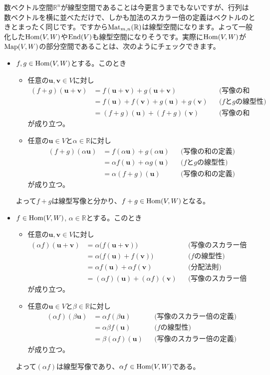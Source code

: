 数ベクトル空間$\mathbb{R}^n$が線型空間であることは今更言うまでもないですが、行列は数ベクトルを横に並べただけで、しかも加法のスカラー倍の定義はベクトルのときとまったく同じです。ですから$\operatorname{Mat}_{m, n}(\mathbb{R})$は線型空間になります。よって一般化した$\operatorname{Hom}(V, W)$や$\operatorname{End}(V)$も線型空間になりそうです。実際に$\operatorname{Hom}(V, W)$が$\operatorname{Map}(V, W)$の部分空間であることは、次のようにチェックできます。
\begin{itemize}
\item $f, g\in \operatorname{Hom}(V, W)$とする。このとき
\begin{itemize}
\item 任意の$\bm{u}, \bm{v}\in V$に対し
\begin{align*}
(f + g)(\bm{u} + \bm{v})
&= f(\bm{u} + \bm{v}) + g(\bm{u} + \bm{v}) & & \text{(写像の和の定義)} \\
&= f(\bm{u}) + f(\bm{v}) + g(\bm{u}) + g(\bm{v}) & & \text{($f$と$g$の線型性)} \\
&= (f + g)(\bm{u}) + (f + g)(\bm{v}) & & \text{(写像の和の定義)}
\end{align*}
が成り立つ。
\item 任意の$\bm{u} \in V$と$\alpha \in \mathbb{R}$に対し
\begin{align*}
(f + g)(\alpha \bm{u})
&= f(\alpha \bm{u}) + g(\alpha \bm{u}) & & \text{(写像の和の定義)} \\
&= \alpha f(\bm{u}) + \alpha g(\bm{u}) & & \text{($f$と$g$の線型性)} \\
&= \alpha(f + g)(\bm{u}) & & \text{(写像の和の定義)}
\end{align*}
が成り立つ。
\end{itemize}
よって$f + g$は線型写像と分かり、$f+g \in \operatorname{Hom}(V, W)$となる。
\item $f\in \operatorname{Hom}(V, W)$, $\alpha \in \mathbb{R}$とする。このとき
\begin{itemize}
\item 任意の$\bm{u}, \bm{v}\in V$に対し
\begin{align*}
(\alpha f)(\bm{u} + \bm{v})
&= \alpha\bigl(f(\bm{u} + \bm{v})\bigr) & & \text{(写像のスカラー倍の定義)} \\
&= \alpha\bigl(f(\bm{u}) + f(\bm{v})\bigr) & & \text{($f$の線型性)} \\
&= \alpha f(\bm{u}) + \alpha f(\bm{v}) & & \text{(分配法則)} \\
&= (\alpha f)(\bm{u}) + (\alpha f)(\bm{v}) & & \text{(写像のスカラー倍の定義)}
\end{align*}
が成り立つ。
\item 任意の$\bm{u} \in V$と$\beta \in \mathbb{R}$に対し
\begin{align*}
(\alpha f)(\beta\bm{u})
&= \alpha f(\beta\bm{u}) & & \text{(写像のスカラー倍の定義)} \\
&= \alpha \beta f(\bm{u}) & & \text{($f$の線型性)} \\
&= \beta(\alpha f)(\bm{u}) & & \text{(写像のスカラー倍の定義)}
\end{align*}
が成り立つ。
\end{itemize}
よって$(\alpha f)$は線型写像であり、$\alpha f\in \operatorname{Hom}(V, W)$である。
\end{itemize}

